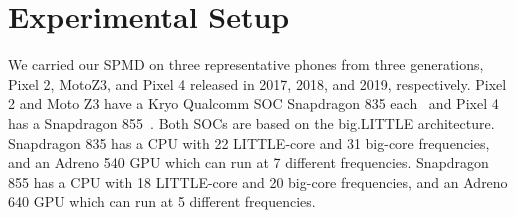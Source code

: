 \section{Experimental Setup}
\label{sec:etup}



 



We carried our SPMD on three representative phones from three generations,
Pixel 2, MotoZ3, and Pixel 4 released in 2017, 2018, and 2019, respectively.
Pixel 2 and Moto Z3 have a Kryo Qualcomm SOC Snapdragon 835 each~\cite{snapdragon835} and Pixel
4 has a Snapdragon 855~\cite{snapdragon855}. Both SOCs are based on the
big.LITTLE architecture.  
Snapdragon 835 has a CPU with 22 LITTLE-core and 31 big-core frequencies, 
and an Adreno 540 GPU which can run at 7 different frequencies.
Snapdragon 855 has a CPU with 18 LITTLE-core and 20 big-core frequencies,  
and an Adreno 640 GPU which can run at 5 different frequencies.

